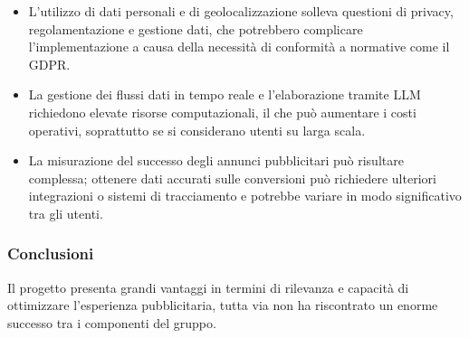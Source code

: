     \begin{itemize}
        \item L’utilizzo di dati personali e di geolocalizzazione solleva questioni di privacy, regolamentazione e gestione dati, che potrebbero complicare l’implementazione a causa della necessità di conformità a normative come il GDPR.
        \item La gestione dei flussi dati in tempo reale e l’elaborazione tramite LLM richiedono elevate risorse computazionali, il che può aumentare i costi operativi, soprattutto se si considerano utenti su larga scala.
        \item La misurazione del successo degli annunci pubblicitari può risultare complessa; ottenere dati accurati sulle conversioni può richiedere ulteriori integrazioni o sistemi di tracciamento e potrebbe variare in modo significativo tra gli utenti.
    \end{itemize}
    
    \subsubsection{Conclusioni}

    Il progetto presenta grandi vantaggi in termini di rilevanza e capacità di ottimizzare l'esperienza pubblicitaria, tutta via non ha riscontrato un enorme successo tra i componenti del gruppo.
